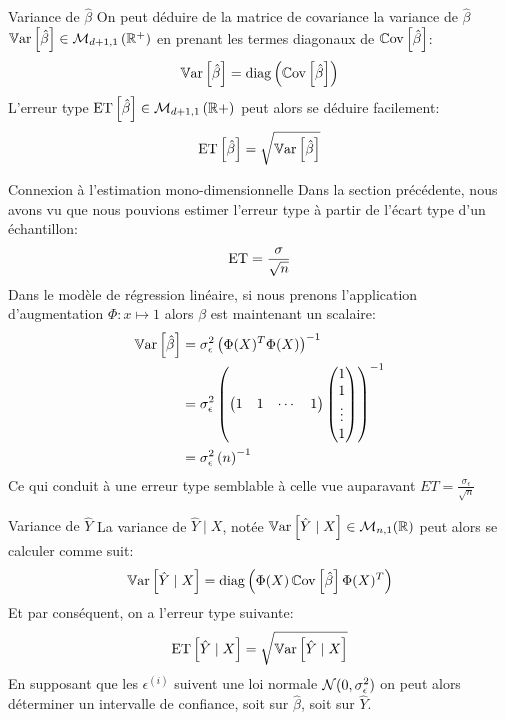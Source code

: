 \begin{frame}{Variance de $\hat{\beta}$}
	On peut déduire de la matrice de covariance la variance de $\hat{\beta}$ $\operatorname{\mathbb{V}ar}\left[\hat{\beta}\right] \in \mathcal{M}_{d+1, 1}\left(\mathbb{R^+}\right)$ en prenant les termes diagonaux de $\operatorname{\mathbb{C}ov}\left[\hat{\beta}\right]$:
	\begin{equation}
		\operatorname{\mathbb{V}ar}\left[\hat{\beta}\right] = \operatorname{diag} \left(\operatorname{\mathbb{C}ov}\left[\hat{\beta}\right]\right)
		\nonumber
	\end{equation}
	\pause
	L'erreur type $\ET[\hat{\beta}] \in \mathcal{M}_{d+1, 1}\left(\mathbb{R+}\right)$ peut alors se déduire facilement:
	\begin{equation}
		\ET[\hat{\beta}] = \sqrt{\Var{\hat{\beta}}}
		\nonumber
	\end{equation}
\end{frame}

\begin{frame}{Connexion à l'estimation mono-dimensionnelle}
	Dans la section précédente, nous avons vu que nous pouvions estimer l'erreur type à partir de l'écart type d'un échantillon:
	\begin{equation}
		\ET = \frac{\sigma}{\sqrt{n}}
		\nonumber
	\end{equation}
	Dans le modèle de régression linéaire, si nous prenons l'application d'augmentation $\Phi: x \mapsto 1$ alors $\beta$ est maintenant un scalaire:
	\begin{equation}
		\begin{aligned}
			\operatorname{\mathbb{V}ar}\left[\hat{\beta}\right] &= \sigma_{\epsilon}^2 \left(\Phi(X)^T \Phi(X)\right)^{-1} \\
			&= \sigma_{\epsilon}^2 \left(\begin{pmatrix}
				1 & 1 & \cdots & 1
			\end{pmatrix}\begin{pmatrix}
				1 \\ 1 \\ \vdots \\ 1
			\end{pmatrix}
			\right)^{-1} \\
			&= \sigma_{\epsilon}^2 \left(n\right)^{-1}
		\end{aligned}
		\nonumber
	\end{equation}
	Ce qui conduit à une erreur type semblable à celle vue auparavant $ET = \frac{\sigma_{\epsilon}}{\sqrt{n}}$	
\end{frame}

\begin{frame}{Variance de $\hat{Y}$}
	La variance de $\hat{Y} \mid X$, notée $\operatorname{\mathbb{V}ar}\left[\hat{Y} \mid X\right] \in \mathcal{M}_{n,1}(\mathbb{R})$ peut alors se calculer comme suit:
	\begin{equation}
		\operatorname{\mathbb{V}ar}\left[\hat{Y} \mid X\right] = \operatorname{diag} \left(\Phi(X) \operatorname{\mathbb{C}ov}\left[\hat{\beta}\right] \Phi(X)^T\right)
		\nonumber
	\end{equation}
	\pause
	Et par conséquent, on a l'erreur type suivante:
	\begin{equation}
		\ET[\hat{Y} \mid X] = \sqrt{\Var{\hat{Y} \mid X}}
		\nonumber
	\end{equation}	
	\pause
	En supposant que les $\epsilon^{(i)}$ suivent une loi normale $\mathcal{N}(0, \sigma_{\epsilon}^2)$ on peut alors déterminer un intervalle de confiance, soit sur $\hat{\beta}$, soit sur $\hat{Y}$.
\end{frame}

